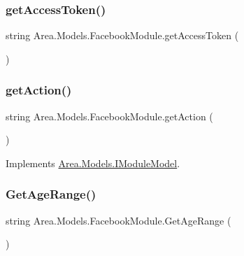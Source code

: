 \subsubsection{\texorpdfstring{get\+Access\+Token()}{getAccessToken()}}
{\footnotesize\ttfamily string Area.\+Models.\+Facebook\+Module.\+get\+Access\+Token (\begin{DoxyParamCaption}{ }\end{DoxyParamCaption})\hspace{0.3cm}{\ttfamily [inline]}}

\mbox{\label{classArea_1_1Models_1_1FacebookModule_aeb88d4de280aa76fa80c92509b7df265}} 
\subsubsection{\texorpdfstring{get\+Action()}{getAction()}}
{\footnotesize\ttfamily string Area.\+Models.\+Facebook\+Module.\+get\+Action (\begin{DoxyParamCaption}{ }\end{DoxyParamCaption})\hspace{0.3cm}{\ttfamily [inline]}}



Implements \mbox{\hyperlink{interfaceArea_1_1Models_1_1IModuleModel_a050d892fae9f85c6b607a7c0e30502e9}{Area.\+Models.\+I\+Module\+Model}}.

\mbox{\label{classArea_1_1Models_1_1FacebookModule_aa43092f0d311e77e152eb60963d90de5}} 
\subsubsection{\texorpdfstring{Get\+Age\+Range()}{GetAgeRange()}}
{\footnotesize\ttfamily string Area.\+Models.\+Facebook\+Module.\+Get\+Age\+Range (\begin{DoxyParamCaption}{ }\end{DoxyParamCaption})\hspace{0.3cm}{\ttfamily [inline]}}

